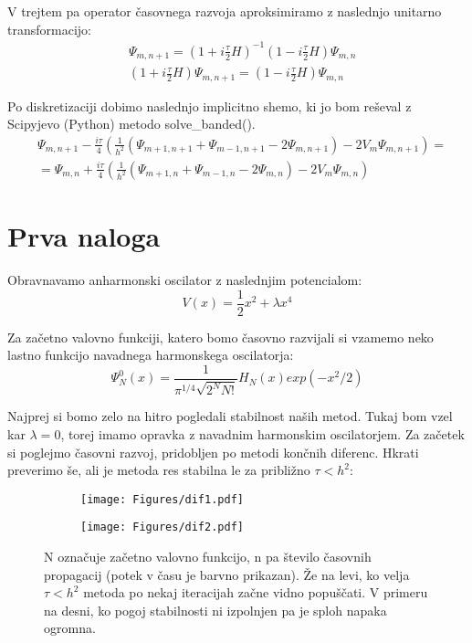 \documentclass{article}
\begin{document}
V trejtem pa operator časovnega razvoja aproksimiramo z naslednjo unitarno transformacijo:
\begin{align*}
&\Psi_{m,n+1} = \left( 1+i \frac{\tau}{2}H \right)^{-1} \left(1-i\frac{\tau}{2}H \right) \Psi_{m,n} \\
&\left( 1+i \frac{\tau}{2}H \right) \Psi_{m,n+1} = \left( 1-i \frac{\tau}{2} H \right) \Psi_{m,n}
\end{align*}

Po diskretizaciji dobimo naslednjo implicitno shemo, ki jo bom reševal z Scipyjevo (Python) metodo solve\_banded().
\begin{align*}
&\Psi_{m,n+1} - \frac{i \tau}{4} \left(\frac{1}{h^2}(\Psi_{m+1,n+1} + \Psi_{m-1,n+1} - 2 \Psi_{m,n+1} ) - 2 V_m \Psi_{m,n+1} \right) = \\
&= \Psi_{m,n} + \frac{i \tau}{4}  \left(\frac{1}{h^2}(\Psi_{m+1,n} + \Psi_{m-1,n} - 2 \Psi_{m,n} ) - 2 V_m \Psi_{m,n} \right)
\end{align*}

\section{Prva naloga}

Obravnavamo anharmonski oscilator z naslednjim potencialom:
\begin{equation*}
V(x) = \frac{1}{2} x^2 + \lambda x^4 
\end{equation*}

Za začetno valovno funkciji, katero bomo časovno razvijali si vzamemo neko lastno funkcijo navadnega harmonskega oscilatorja:
\begin{equation*}
\Psi^0_N(x) = \frac{1}{\pi^{1/4}\sqrt{2^N N!}} H_N (x) exp(-x^2/2)
\end{equation*}

Najprej si bomo zelo na hitro pogledali stabilnost naših metod. Tukaj bom vzel kar $\lambda = 0$, torej imamo opravka z navadnim harmonskim oscilatorjem.
Za začetek si poglejmo časovni razvoj, pridobljen po metodi končnih diferenc. Hkrati preverimo še, ali je metoda res stabilna le za približno $\tau < h^2$:

\begin{figure}[H]
\centering
\begin{subfigure}{.49\textwidth}
\texttt{[image: Figures/dif1.pdf]}
\end{subfigure}
\begin{subfigure}{.49\textwidth}
\texttt{[image: Figures/dif2.pdf]}
\end{subfigure}
\caption*{N označuje začetno valovno funkcijo, n pa število časovnih propagacij (potek v času je barvno prikazan). Že na levi, ko velja $\tau < h^2$ metoda po nekaj iteracijah začne vidno popuščati. V primeru na desni, ko pogoj stabilnosti ni izpolnjen pa je sploh napaka ogromna.}
\end{figure}
\end{document}

